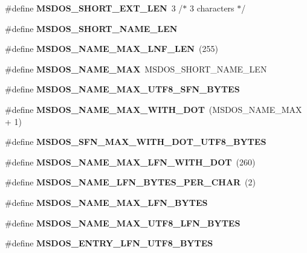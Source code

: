 \begin{DoxyCompactItemize}
\#define {\bfseries M\+S\+D\+O\+S\+\_\+\+S\+H\+O\+R\+T\+\_\+\+E\+X\+T\+\_\+\+L\+EN}~3  /$\ast$ 3 characters $\ast$/
\item 
\#define {\bfseries M\+S\+D\+O\+S\+\_\+\+S\+H\+O\+R\+T\+\_\+\+N\+A\+M\+E\+\_\+\+L\+EN}
\item 
\mbox{\label{group__libfs__msdos_ga8312a2eec667d577d540439fc00dba6f}} 
\#define {\bfseries M\+S\+D\+O\+S\+\_\+\+N\+A\+M\+E\+\_\+\+M\+A\+X\+\_\+\+L\+N\+F\+\_\+\+L\+EN}~(255)
\item 
\mbox{\label{group__libfs__msdos_gae0ffc6a8962922624d758593497398bf}} 
\#define {\bfseries M\+S\+D\+O\+S\+\_\+\+N\+A\+M\+E\+\_\+\+M\+AX}~M\+S\+D\+O\+S\+\_\+\+S\+H\+O\+R\+T\+\_\+\+N\+A\+M\+E\+\_\+\+L\+EN
\item 
\#define {\bfseries M\+S\+D\+O\+S\+\_\+\+N\+A\+M\+E\+\_\+\+M\+A\+X\+\_\+\+U\+T\+F8\+\_\+\+S\+F\+N\+\_\+\+B\+Y\+T\+ES}
\item 
\mbox{\label{group__libfs__msdos_gae4932b30b80186de749db45077de283f}} 
\#define {\bfseries M\+S\+D\+O\+S\+\_\+\+N\+A\+M\+E\+\_\+\+M\+A\+X\+\_\+\+W\+I\+T\+H\+\_\+\+D\+OT}~(M\+S\+D\+O\+S\+\_\+\+N\+A\+M\+E\+\_\+\+M\+AX + 1)
\item 
\#define {\bfseries M\+S\+D\+O\+S\+\_\+\+S\+F\+N\+\_\+\+M\+A\+X\+\_\+\+W\+I\+T\+H\+\_\+\+D\+O\+T\+\_\+\+U\+T\+F8\+\_\+\+B\+Y\+T\+ES}
\item 
\mbox{\label{group__libfs__msdos_gaf960ba68111f252a1c0d899f1d1e27e0}} 
\#define {\bfseries M\+S\+D\+O\+S\+\_\+\+N\+A\+M\+E\+\_\+\+M\+A\+X\+\_\+\+L\+F\+N\+\_\+\+W\+I\+T\+H\+\_\+\+D\+OT}~(260)
\item 
\mbox{\label{group__libfs__msdos_ga895fdff1f0e91eb90a2239a8c2a0d6ee}} 
\#define {\bfseries M\+S\+D\+O\+S\+\_\+\+N\+A\+M\+E\+\_\+\+L\+F\+N\+\_\+\+B\+Y\+T\+E\+S\+\_\+\+P\+E\+R\+\_\+\+C\+H\+AR}~(2)
\item 
\#define {\bfseries M\+S\+D\+O\+S\+\_\+\+N\+A\+M\+E\+\_\+\+M\+A\+X\+\_\+\+L\+F\+N\+\_\+\+B\+Y\+T\+ES}
\item 
\#define {\bfseries M\+S\+D\+O\+S\+\_\+\+N\+A\+M\+E\+\_\+\+M\+A\+X\+\_\+\+U\+T\+F8\+\_\+\+L\+F\+N\+\_\+\+B\+Y\+T\+ES}
\item 
\#define {\bfseries M\+S\+D\+O\+S\+\_\+\+E\+N\+T\+R\+Y\+\_\+\+L\+F\+N\+\_\+\+U\+T\+F8\+\_\+\+B\+Y\+T\+ES}

\end{DoxyCompactItemize}
